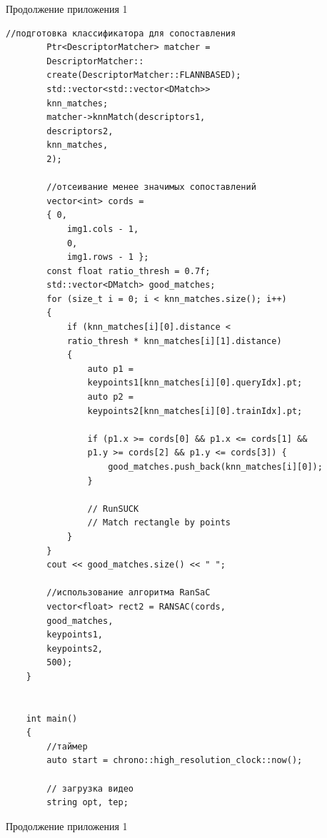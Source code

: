 \documentclass[14pt, a4paper]{extreport}
\begin{document}
\noindent Продолжение приложения 1
\begin{Verbatim}[fontseries=c, fontsize=\fontsize{10pt}{12pt}\selectfont]
		//подготовка классификатора для сопоставления
		Ptr<DescriptorMatcher> matcher =
		DescriptorMatcher::
		create(DescriptorMatcher::FLANNBASED);
		std::vector<std::vector<DMatch>>
		knn_matches;
		matcher->knnMatch(descriptors1,
		descriptors2,
		knn_matches,
		2);
		
		//отсеивание менее значимых сопоставлений
		vector<int> cords =
		{ 0,
			img1.cols - 1,
			0,
			img1.rows - 1 };
		const float ratio_thresh = 0.7f;
		std::vector<DMatch> good_matches;
		for (size_t i = 0; i < knn_matches.size(); i++)
		{
			if (knn_matches[i][0].distance <
			ratio_thresh * knn_matches[i][1].distance)
			{
				auto p1 =
				keypoints1[knn_matches[i][0].queryIdx].pt;
				auto p2 =
				keypoints2[knn_matches[i][0].trainIdx].pt;
				
				if (p1.x >= cords[0] && p1.x <= cords[1] &&
				p1.y >= cords[2] && p1.y <= cords[3]) {
					good_matches.push_back(knn_matches[i][0]);
				}
				
				// RunSUCK
				// Match rectangle by points
			}
		}
		cout << good_matches.size() << " ";
		
		//использование алгоритма RanSaC
		vector<float> rect2 = RANSAC(cords,
		good_matches,
		keypoints1,
		keypoints2,
		500);
	}
	
	
	int main()
	{
		//таймер
		auto start = chrono::high_resolution_clock::now();
		
		// загрузка видео
		string opt, tep;
\end{Verbatim}
\noindent Продолжение приложения 1
\end{document}
